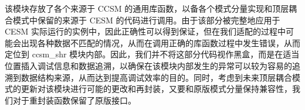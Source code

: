 该模块存放了各个来源于 CCSM 的通用库函数，以备各个模式分量实现和顶层耦合模式中保留的来源于 CESM 的代码进行调用。由于该部分被完整地应用于 CESM 实际运行的实例中，因此正确性可以得到保证，但在我们适配的过程中可能会出现各种数据不匹配的情况，从而在调用正确的库函数过程中发生错误，从而定位到 ccsm\_shr 模块内部。因此，我们并不将这部分代码视作黑盒，而是在适当位置插入调试信息和数据追溯，以确保在该模块内部发生的异常可以较为容易的追溯到数据结构来源，从而达到提高调试效率的目的。同时，考虑到未来顶层耦合模式的更新对该模块进行可能的更改和再封装，又要和原版模式分量保持兼容性，我们对于重封装函数保留了原版接口。